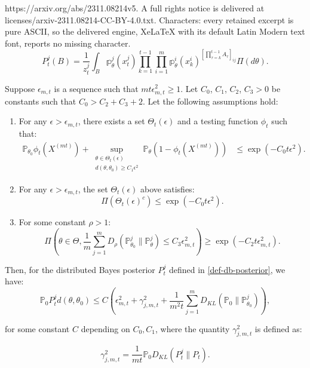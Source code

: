 \documentclass[10pt,a4paper]{amsart}
\newcommand\bP{\mathbb{P}}
\newcommand\bp{\mathbb{p}}
\begin{document}
https://arxiv.org/abs/2311.08214v5. A full rights notice is delivered at licenses/arxiv-2311.08214-CC-BY-4.0.txt. Characters: every retained excerpt is pure ASCII, so the delivered engine, XeLaTeX with its default Latin Modern text font, reports no missing character.
\begin{equation} \label{def-db-posterior}
    P_{t}^j(B) = \frac{1}{z_t^j}\int_B \bp_\theta^j(x_t^j) \prod_{k = 1}^{t - 1} \prod_{i = 1}^m \bp_\theta^i(x_k^i)^{\left[\prod_{\tau = k}^{t-1}A_\tau \right]_{ij}}  \Pi(d\theta). 
\end{equation}

\begin{theorem} \label{thm:contraction1}
Suppose $\epsilon_{m,t}$ is a sequence such that $mt\epsilon_{m,t}^2 \geq 1$. Let $C_0$, $C_1$, $C_2$, $C_3 > 0$ be constants such that $C_0 > C_2 + C_3 + 2$. Let the following assumptions hold:  
\begin{enumerate}
\item For any $\epsilon > \epsilon_{m,t}$, there exists a set $\Theta_t(\epsilon)$ and a testing function $\phi_t$ such that:
\begin{align}
\bP_{\theta_0} \phi_t(X^{(mt)}) + \sup_{\substack{\theta \in \Theta_t(\epsilon)\\ d(\theta, \theta_0) \geq C_1 \epsilon^2}} \bP_\theta (1 - \phi_t(X^{(mt)})) &\leq \exp\left(-C_0 t \epsilon^2\right). \tag{C1} \label{assumption:C1}
\end{align}

\item For any $\epsilon > \epsilon_{m,t}$, the set $\Theta_t(\epsilon)$ above satisfies:
\begin{equation}
\Pi\left(\Theta_t(\epsilon)^c\right) \leq \exp\left(-C_0 t \epsilon^2\right). \tag{C2} \label{assumption:C2}
\end{equation}

\item For some constant $\rho > 1$:
\begin{equation}
\Pi\left(\theta \in \Theta,  \frac{1}{m} \sum_{j = 1}^m D_\rho(\bP_{\theta_0}^j \parallel \bP_\theta^j) \leq C_3 \epsilon_{m,t}^2 \right) \geq \exp\left(-C_2 t \epsilon_{m,t}^2\right). \tag{C3} \label{assumption:C3}
\end{equation}
\end{enumerate}
 Then, for the distributed Bayes posterior $P_t^j$ defined in \eqref{def-db-posterior}, we have:
\begin{equation}\label{eqn:contraction11}
    \bP_0 P_t^j d(\theta, \theta_0) \leq C \left(\epsilon_{m,t}^2 + \gamma_{j,m,t}^2+ \frac{1}{m^2 t} \sum_{j = 1}^m D_{KL}(\bP_0 \parallel \bP_{\theta_0}^j) \right), 
\end{equation}

for some constant $C$ depending on $C_0, C_1$, where the quantity $\gamma_{j,m,t}^2$ is defined as:

\begin{equation*}
\gamma_{j,m,t}^2 =  \frac{1}{mt} \bP_0 D_{KL}(P_t^j \parallel P_t). 
\end{equation*}
\end{theorem}
\end{document}
